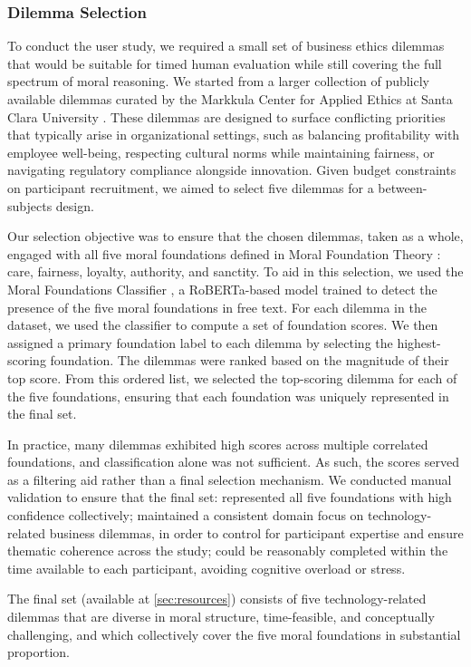 \subsubsection{Dilemma Selection}
\label{sec:dilemmas}

To conduct the user study, we required a small set of business ethics dilemmas that would be suitable for timed human evaluation while still covering the full spectrum of moral reasoning. We started from a larger collection of publicly available dilemmas curated by the Markkula Center for Applied Ethics at Santa Clara University \cite{scu}.
These dilemmas are designed to surface conflicting priorities that typically arise in organizational settings, such as balancing profitability with employee well-being, respecting cultural norms while maintaining fairness, or navigating regulatory compliance alongside innovation.
Given budget constraints on participant recruitment, we aimed to select five dilemmas for a between-subjects design.

Our selection objective was to ensure that the chosen dilemmas, taken as a whole, engaged with all five moral foundations defined in Moral Foundation Theory \cite{GRAHAM201355}: care, fairness, loyalty, authority, and sanctity. To aid in this selection, we used the Moral Foundations Classifier \cite{ardag2024moral}, a RoBERTa-based model trained to detect the presence of the five moral foundations in free text.
For each dilemma in the dataset, we used the classifier to compute a set of foundation scores. We then assigned a primary foundation label to each dilemma by selecting the highest-scoring foundation. The dilemmas were ranked based on the magnitude of their top score. From this ordered list, we selected the top-scoring dilemma for each of the five foundations, ensuring that each foundation was uniquely represented in the final set.

In practice, many dilemmas exhibited high scores across multiple correlated foundations, and classification alone was not sufficient. As such, the scores served as a filtering aid rather than a final selection mechanism.
We conducted manual validation to ensure that the final set:
represented all five foundations with high confidence collectively;
maintained a consistent domain focus on technology-related business dilemmas, in order to control for participant expertise and ensure thematic coherence across the study;
could be reasonably completed within the time available to each participant, avoiding cognitive overload or stress.

The final set (available at \ref{sec:resources}) consists of five technology-related dilemmas that are diverse in moral structure, time-feasible, and conceptually challenging, and which collectively cover the five moral foundations in substantial proportion.
